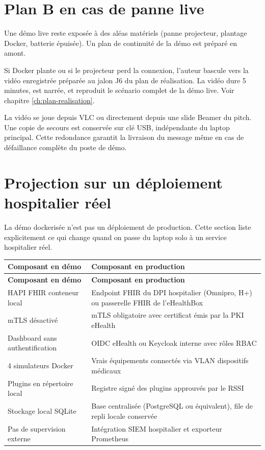 \section{Plan B en cas de panne live}
\label{sec:deploiement-plan-b}

Une démo live reste exposée à des aléas matériels (panne projecteur, plantage Docker, batterie épuisée). Un plan de continuité de la démo est préparé en amont.

\begin{bridgewarn}
Si Docker plante ou si le projecteur perd la connexion, l'auteur bascule vers la vidéo enregistrée préparée au jalon J6 du plan de réalisation. La vidéo dure 5 minutes, est narrée, et reproduit le scénario complet de la démo live. Voir chapitre \ref{ch:plan-realisation}.
\end{bridgewarn}

La vidéo se joue depuis VLC ou directement depuis une slide Beamer du pitch. Une copie de secours est conservée sur clé USB, indépendante du laptop principal. Cette redondance garantit la livraison du message même en cas de défaillance complète du poste de démo.

\section{Projection sur un déploiement hospitalier réel}
\label{sec:deploiement-projection-prod}

La démo dockerisée n'est pas un déploiement de production. Cette section liste explicitement ce qui change quand on passe du laptop solo à un service hospitalier réel.

\bridgezebra
\begin{longtable}{p{6.5cm}p{7.5cm}}
  \toprule
  \rowcolor{bridgeblue!90}
  {\color{white}\bfseries Composant en démo} & {\color{white}\bfseries Composant en production} \\
  \midrule
  \endfirsthead
  \toprule
  \rowcolor{bridgeblue!90}
  {\color{white}\bfseries Composant en démo} & {\color{white}\bfseries Composant en production} \\
  \midrule
  \endhead
  \bottomrule
  \endfoot
  HAPI FHIR conteneur local      & Endpoint FHIR du DPI hospitalier (Omnipro, H+) ou passerelle FHIR de l'eHealthBox \\
  mTLS désactivé                 & mTLS obligatoire avec certificat émis par la PKI eHealth \\
  Dashboard sans authentification & OIDC eHealth ou Keycloak interne avec rôles RBAC \\
  4 simulateurs Docker           & Vrais équipements connectés via VLAN dispositifs médicaux \\
  Plugins en répertoire local    & Registre signé des plugins approuvés par le RSSI \\
  Stockage local SQLite          & Base centralisée (PostgreSQL ou équivalent), file de repli locale conservée \\
  Pas de supervision externe     & Intégration SIEM hospitalier et exporteur Prometheus \\
\end{longtable}

